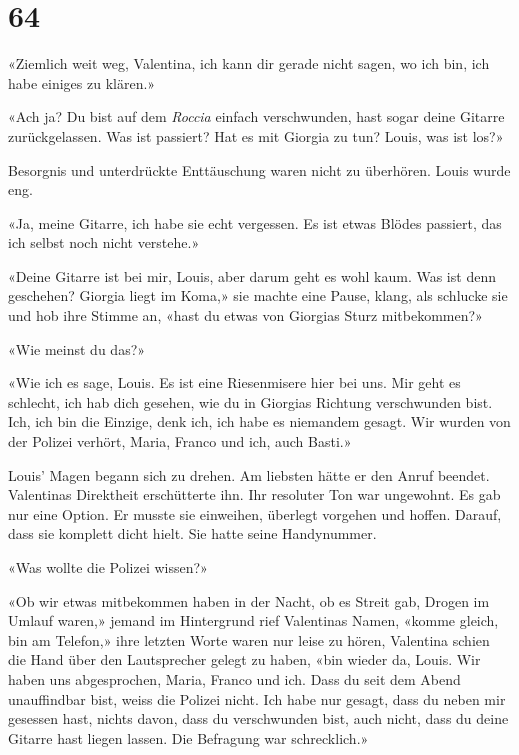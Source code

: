 \chapter{64}



«Ziemlich weit weg, Valentina, ich kann dir gerade nicht sagen, wo ich
bin, ich habe einiges zu klären.»

«Ach ja? Du bist auf dem \emph{Roccia} einfach verschwunden, hast sogar
deine Gitarre zurückgelassen. Was ist passiert? Hat es mit Giorgia zu
tun? Louis, was ist los?»

Besorgnis und unterdrückte Enttäuschung waren nicht zu überhören. Louis
wurde eng.

«Ja, meine Gitarre, ich habe sie echt vergessen. Es ist etwas Blödes
passiert, das ich selbst noch nicht verstehe.»

«Deine Gitarre ist bei mir, Louis, aber darum geht es wohl kaum. Was ist
denn geschehen? Giorgia liegt im Koma,» sie machte eine Pause,
klang, als schlucke sie und hob ihre Stimme an, «hast du etwas von
Giorgias Sturz mitbekommen?»

«Wie meinst du das?»

«Wie ich es sage, Louis. Es ist eine Riesenmisere hier bei uns. Mir
geht es schlecht, ich hab dich gesehen, wie du in Giorgias Richtung
verschwunden bist. Ich, ich bin die Einzige, denk ich, ich habe es
niemandem gesagt. Wir wurden von der Polizei verhört, Maria, Franco und
ich, auch Basti.»

Louis’ Magen begann sich zu drehen. Am liebsten hätte er den Anruf
beendet. Valentinas Direktheit erschütterte ihn. Ihr resoluter Ton war
ungewohnt. Es gab nur eine Option. Er musste sie einweihen, überlegt vorgehen und
hoffen. Darauf, dass sie komplett dicht hielt. Sie hatte seine
Handynummer.

«Was wollte die Polizei wissen?»

«Ob wir etwas mitbekommen haben in der Nacht, ob es Streit gab, Drogen
im Umlauf waren,» jemand im Hintergrund rief Valentinas Namen, «komme
gleich, bin am Telefon,» ihre letzten Worte waren nur leise zu hören,
Valentina schien die Hand über den Lautsprecher gelegt zu haben, «bin
wieder da, Louis. Wir haben uns abgesprochen, Maria, Franco und ich.
Dass du seit dem Abend unauffindbar bist, weiss die Polizei nicht. Ich
habe nur gesagt, dass du neben mir gesessen hast, nichts davon, dass du
verschwunden bist, auch nicht, dass du deine Gitarre hast liegen lassen.
Die Befragung war schrecklich.»

